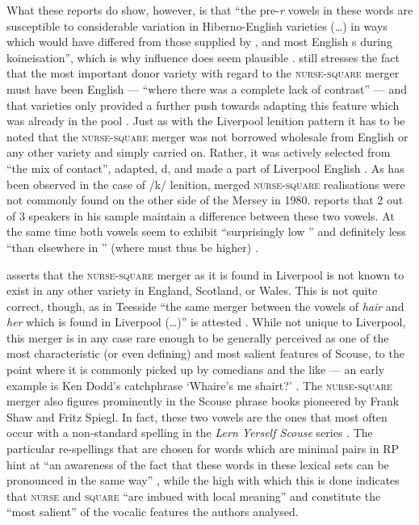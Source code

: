 What these reports do show, however, is that ``the pre-\emph{r} vowels in these words are susceptible to considerable variation in Hiberno-English varieties (\ldots) in ways which would have differed from those supplied by ,  and most English s during koineisation'', which is why  influence does seem plausible \citep[128]{honeybone2007}.
\parencite{honeybone2007} still stresses the fact that the most important donor variety with regard to the \textsc{nurse}-\textsc{square} merger must have been  English --- ``where there was a complete lack of contrast'' --- and that  varieties only provided a further push towards adapting this feature which was already in the pool \citep[129]{honeybone2007}.
Just as with the Liverpool lenition pattern it has to be noted that the \textsc{nurse}-\textsc{square} merger was not borrowed wholesale from  English or any other variety and simply carried on. 
Rather, it was actively selected from ``the mix of  contact'', adapted, d, and made a part of Liverpool English \parencite[cf.][129]{honeybone2007}.
As has been observed in the case of /k/ lenition, merged \textsc{nurse}-\textsc{square} realisations were not commonly found on the other side of the Mersey in 1980.
\textcite[95]{newbrook1999} reports that 2 out of 3 speakers in his sample maintain a difference between these two vowels.
At the same time both vowels seem to exhibit ``surprisingly low '' and definitely less ``than elsewhere in '' (where  must thus be higher) \parencite[95]{newbrook1999}.

\citet[cf.][128]{honeybone2007} asserts that the \textsc{nurse}-\textsc{square} merger as it is found in Liverpool is not known to exist in any other variety in England, Scotland, or Wales.
This is not quite correct, though, as in Teesside ``the same merger between the vowels of \emph{hair} and \emph{her} which is found in Liverpool (\dots)'' is attested \parencite[70]{trudgill1999}.
While not unique to Liverpool, this merger is in any case rare enough to be generally perceived as one of the most characteristic (or even defining) and most salient features of Scouse, to the point where it is commonly picked up by comedians and the like --- an early example is Ken Dodd's catchphrase `Whaire's me shairt?' \citep[cf.][73]{trudgill1999}.
The \textsc{nurse}-\textsc{square} merger also figures prominently in the Scouse phrase books pioneered by Frank Shaw and Fritz Spiegl.
In fact, these two vowels are the ones that most often occur with a non-standard spelling in the \emph{Lern Yerself Scouse} series \parencite[cf.][322]{honeybonewatson2013}.
The particular re-spellings that are chosen for words which are minimal pairs in RP hint at ``an awareness of the fact that these words in these lexical sets can be pronounced in the same way'' \parencite[324]{honeybonewatson2013}, while the high  with which this is done indicates that \textsc{nurse} and \textsc{square} ``are imbued with local meaning'' and constitute the ``most salient'' of the vocalic features the authors analysed.

